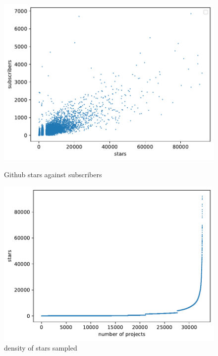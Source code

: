 \documentclass[twoside,12pt,titlepage,a4paper]{article}
\begin{document}
\begin{figure}[!htbp]
  \centering
  \begin{minipage}{.48\textwidth}
    \centering
    \includegraphics[width=\textwidth]{../src/results/sub vs stars.pdf}
    \caption[alt text]{Github stars against subscribers}
    \label{graph_scatter_stars_vs_subs}
  \end{minipage}
  \begin{minipage}{.48\textwidth}
    \centering
  \includegraphics[width=\textwidth]{../src/results/spread over time.pdf}
  \caption[alt text]{density of stars sampled}
  \label{graph_scatter_stars_line}
  \end{minipage}
\end{figure}
\end{document}

